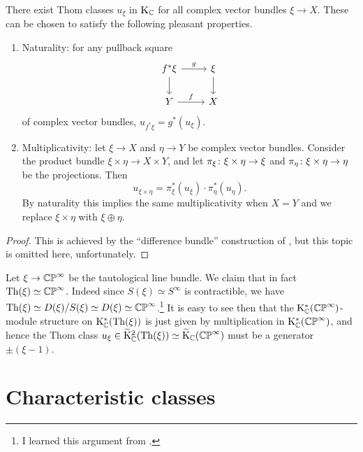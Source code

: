 \begin{proposition}
  \label{thom-K}
  There exist Thom classes $u_\xi$ in $\mathrm{K}_{\mathbb{C}}$ for all complex vector
  bundles $\xi \to X$. These can be chosen to satisfy the following
  pleasant properties.
  \begin{enumerate}
  \item Naturality: for any pullback square
    \[
    \begin{tikzcd}
      f^*\xi \rar{g} \dar & \xi \dar \\ Y \rar{f} & X
    \end{tikzcd}
    \]
    of complex vector bundles, $u_{f^*\xi} = g^*(u_\xi)$.
  \item Multiplicativity: let $\xi \to X$ and $\eta \to Y$ be complex
    vector bundles. Consider the product bundle $\xi \times \eta \to X
    \times Y$, and let $\pi_\xi \colon \xi \times \eta \to \xi$ and
    $\pi_\eta \colon \xi \times \eta \to \eta$ be the projections. Then
    \[
    u_{\xi \times \eta} = \pi_\xi^*(u_\xi) \cdot \pi_\eta^*(u_\eta).
    \]
    By naturality this implies the same multiplicativity when $X=Y$
    and we replace $\xi \times \eta$ with $\xi \oplus \eta$.
  \end{enumerate}
\end{proposition}

\begin{proof}
  This is achieved by the ``difference bundle'' construction of
  \cite{abs-clifford}, but this topic is omitted here, unfortunately.
\end{proof}

\begin{example}
  \label{taut-thom}
  Let $\xi \to \mathbb{CP}^\infty$ be the tautological line bundle. We claim
  that in fact $\operatorname{Th}(\xi) \simeq \mathbb{CP}^\infty$. Indeed since $S(\xi)
  \simeq S^\infty$ is contractible, we have $\operatorname{Th}(\xi) \simeq
  D(\xi)/S(\xi) \simeq D(\xi) \simeq \mathbb{CP}^\infty$.\footnote{I learned
    this argument from \cite{may-mu1}.} It is easy to see then that
  the $\mathrm{K}_{\mathbb{C}}^*(\mathbb{CP}^{\infty})$-module structure on $\mathrm{K}^*_{\mathbb{C}}(\operatorname{Th}(\xi))$
  is just given by multiplication in $\mathrm{K}_{\mathbb{C}}^*(\mathbb{CP}^{\infty})$, and
  hence the Thom class $u_\xi \in \widetilde{\mathrm{K}}_{\mathbb{C}}^2(\operatorname{Th}(\xi)) \simeq
  \widetilde{\mathrm{K}}_{\mathbb{C}}(\mathbb{CP}^\infty)$ must be a generator $\pm(\xi-1)$.
\end{example}


\section{Characteristic classes}


